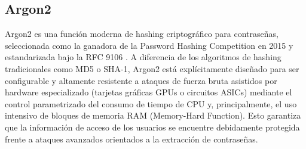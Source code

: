 \subsection{Argon2}
Argon2 es una función moderna de hashing criptográfico para contraseñas, seleccionada como la ganadora de la Password Hashing Competition en 2015 y estandarizada bajo la RFC 9106 \cite{rfc9106}. A diferencia de los algoritmos de hashing tradicionales como MD5 o SHA-1, Argon2 está explícitamente diseñado para ser configurable y altamente resistente a ataques de fuerza bruta asistidos por hardware especializado (tarjetas gráficas GPUs o circuitos ASICs) mediante el control parametrizado del consumo de tiempo de CPU y, principalmente, el uso intensivo de bloques de memoria RAM (Memory-Hard Function). Esto garantiza que la información de acceso de los usuarios se encuentre debidamente protegida frente a ataques avanzados orientados a la extracción de contraseñas.
